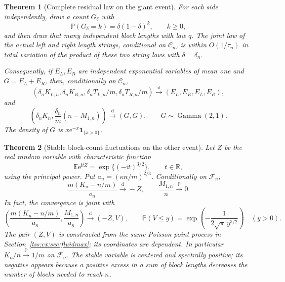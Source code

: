 \documentclass[11pt]{article}
\newtheorem{theorem}{Theorem}[section]
\theoremstyle{remark}\newtheorem{remark}[theorem]{Remark}
\theoremstyle{definition}\newtheorem{definition}[theorem]{Definition}
\newcommand{\ii}{\mathrm i}
\newcommand{\e}{\mathrm e}
\newcommand{\E}{\mathbb E}
\newcommand{\Prob}{\mathbb P}
\newcommand{\R}{\mathbb R}
\newcommand{\ind}{\mathbf 1}
\newcommand{\dto}{\xrightarrow{\mathrm d}}
\newcommand{\pto}{\xrightarrow{\Prob}}
\newcommand{\Cev}{\mathcal C_n}
\newcommand{\Fev}{\mathcal F_n}
\begin{document}
\begin{theorem}[Complete residual law on the giant event]\label{tss:cx:thm:TVmain}
For each side independently, draw a count $G_{\delta}$ with
\[
 \Prob(G_{\delta}=k)=\delta(1-\delta)^k,\qquad k\ge0,
\]
and then draw that many independent block lengths with law $q$.
The joint law of the actual left and right length strings, conditional
on $\Cev$, is within $O(1/\tau_n)$ in total variation of the product
of these two string laws with $\delta=\delta_n$.

Consequently, if $E_L,E_R$ are independent exponential variables of
mean one and $G=E_L+E_R$, then, conditionally on $\Cev$,
\begin{equation}\label{tss:cx:eq:four}
 (\delta_nK_{L,n},\delta_nK_{R,n},
   \delta_nT_{L,n}/m,\delta_nT_{R,n}/m)
 \dto(E_L,E_R,E_L,E_R),
\end{equation}
and
\begin{equation}\label{tss:cx:eq:gamma}
 \left(\delta_nK_n,\frac{\delta_n}{m}(n-M_{1,n})\right)
 \dto(G,G),\qquad G\sim\operatorname{Gamma}(2,1).
\end{equation}
The density of $G$ is $x\e^{-x}\ind_{\{x>0\}}$.
\end{theorem}

\begin{theorem}[Stable block-count fluctuations on the other event]
\label{tss:cx:thm:fluid}
Let $Z$ be the real random variable with characteristic function
\begin{equation}\label{tss:cx:eq:standardstable}
 \E\e^{\ii tZ}=\exp\{(-\ii t)^{3/2}\},\qquad t\in\R,
\end{equation}
using the principal power. Put
$a_n=(\kappa n/m)^{2/3}$. Conditionally on $\Fev$,
\begin{equation}\label{tss:cx:eq:fluid}
 \frac{m(K_n-n/m)}{a_n}\dto -Z,
 \qquad \frac{M_{1,n}}n\pto0.
\end{equation}
In fact, the convergence is joint with
\begin{equation}\label{tss:cx:eq:fluidmaxmain}
 \left(\frac{m(K_n-n/m)}{a_n},\frac{M_{1,n}}{a_n}\right)
 \dto(-Z,V),
 \qquad
 \Prob(V\le y)=\exp\!\left(-\frac1{2\sqrt\pi\,y^{3/2}}\right)
 \quad(y>0).
\end{equation}
The pair $(Z,V)$ is constructed from the same Poisson point process
in Section~\ref{tss:cx:sec:fluidmax}; its coordinates are dependent.
In particular $K_n/n\pto1/m$ on $\Fev$.
The stable variable is centered and spectrally positive; its negative
appears because a positive excess in a sum of block lengths decreases
the number of blocks needed to reach $n$.
\end{theorem}
\end{document}

